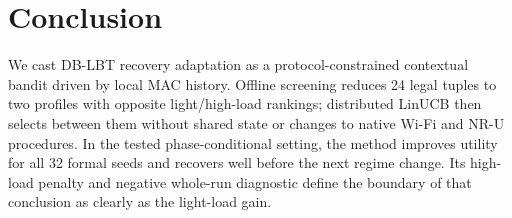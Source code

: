 \section{Conclusion}
\label{sec:conclusion}

We cast DB-LBT recovery adaptation as a protocol-constrained contextual bandit
driven by local MAC history. Offline screening reduces 24 legal tuples to two
profiles with opposite light/high-load rankings; distributed LinUCB then
selects between them without shared state or changes to native Wi-Fi and NR-U
procedures. In the tested phase-conditional setting, the method improves
utility for all 32 formal seeds and recovers well before the next regime
change. Its high-load penalty and negative whole-run diagnostic define the
boundary of that conclusion as clearly as the light-load gain.
